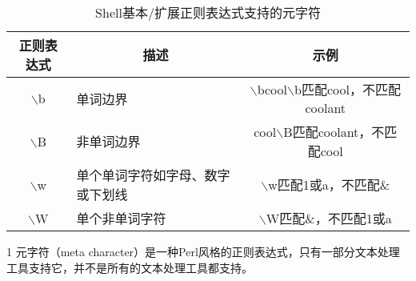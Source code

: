 \begin{table}[htbp]
	\renewcommand{\arraystretch}{1.5}
	\newcommand{\tc}[1]{\multicolumn{1}{c}{#1}}
	\newcommand{\tl}[1]{\multicolumn{1}{l}{#1}}
	\newcommand{\tr}[1]{\multicolumn{1}{r}{#1}}
	\centering
	\caption[metachar]{Shell基本/扩展正则表达式支持的元字符}
	\vspace{0.8em}\centering\wuhao
	\begin{threeparttable}
		\begin{tabular}{clc}
			\toprule[2pt]
			\textbf{正则表达式} & \tc{\textbf{描述}} & \textbf{示例}\\[2pt]
			\midrule[0.8pt]
			$\backslash$b & 单词边界 & $\backslash$bcool$\backslash$b匹配cool，不匹配coolant\\[8pt]
			$\backslash$B & 非单词边界 & cool$\backslash$B匹配coolant，不匹配cool\\[8pt]
			$\backslash$w & 单个单词字符如字母、数字或下划线 & $\backslash$w匹配1或a，不匹配\&\\[8pt]
			$\backslash$W & 单个非单词字符 & $\backslash$W匹配\&，不匹配1或a\\[8pt]
			\bottomrule[2pt]
		\end{tabular}

		\begin{tablenotes}
			\footnotesize
			\item[1] 元字符（meta character）是一种Perl风格的正则表达式，只有一部分文本处理工具支持它，并不是所有的文本处理工具都支持。
		\end{tablenotes}
	\end{threeparttable}
\end{table}

